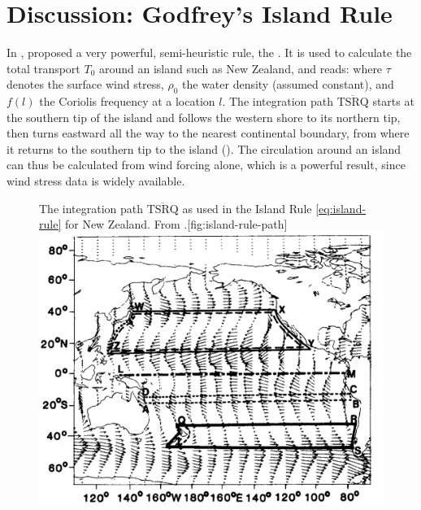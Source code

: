 \section{Discussion: Godfrey's Island Rule}
\label{sec:island-rule}
In \citeyear{godfrey},  proposed a very powerful, semi-heuristic rule, the  \citep{godfrey}. It is used to calculate the total transport \(T_0\) around an island such as \eg New Zealand, and reads:
%
%
where \(\tau\) denotes the surface wind stress, \(\rho_0\) the water density (assumed constant), and \(f(l)\) the Coriolis frequency at a location \(l\). The integration path \(\overline{\text{TSRQ}}\) starts at the southern tip of the island and follows the western shore to its northern tip, then turns eastward all the way to the nearest continental boundary, from where it returns to the southern tip to the island (). The circulation around an island can thus be calculated from wind forcing alone, which is a powerful result, since wind stress data is widely available.

\begin{figure}
	\begin{sidecaption}{The integration path \(\overline{\text{TSRQ}}\) as used in the Island Rule \eqref{eq:island-rule} for New Zealand. From \cite{godfrey}.}[fig:island-rule-path]
		\antimpjustification
		\includegraphics[width=.7\textwidth]{figures/outro/godfrey}
	\end{sidecaption}
\end{figure}

